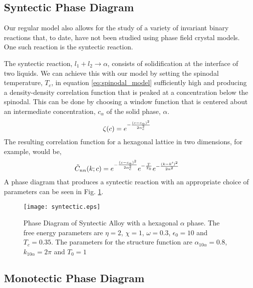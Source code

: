 \subsection{Syntectic Phase Diagram} %

Our regular model also allows for the study of a variety of invariant binary
reactions that, to date, have not been studied using phase field crystal
models. One such reaction is the syntectic reaction. 

The syntectic reaction, $l_1 + l_2 \rightarrow \alpha $, consists of
solidification at the interface of two liquids. We can achieve this with our
model by setting the spinodal temperature, $T_c$, in equation
\ref{eq:spinodal_model} sufficiently high and producing a density-density
correlation function that is peaked at a concentration below the spinodal. This
can be done by choosing a window function that is centered about an
intermediate concentration, $c_\alpha$ of the solid phase, $\alpha$. 
%
\begin{equation}
  \zeta(c) = e^{- \frac{(c - c_\alpha)^2}{2 \alpha_c^2}}
\end{equation}
%
The resulting correlation function for a hexagonal lattice in two dimensions,
for example, would be,
%
\begin{equation}
  \tilde{C}_{nn}(k; c) = 
    e^{-\frac{(c - c_\alpha)^2}{2 \alpha_c^2}}
    e^{-\frac{T}{T_0}} 
    e^{-\frac{(k - k^\prime)^2}{2\alpha^2}}
\end{equation}
%
A phase diagram that produces a syntectic reaction with an appropriate choice
of parameters can be seen in Fig. \ref{syntectic}.

\begin{figure}
    \centering
	\texttt{[image: syntectic.eps]}
    \caption[Syntectic Phase Diagram]{
        \label{syntectic} Phase Diagram of Syntectic Alloy with a hexagonal
        $\alpha$ phase. The free energy parameters are $\eta=2$, $\chi=1$,
        $\omega=0.3$, $\epsilon_0 = 10$ and $T_c=0.35$. The parameters for the
        structure function are $\alpha_{10\alpha} = 0.8$, $k_{10\alpha} = 2\pi$
        and $T_0 = 1$
    }
\end{figure}

\subsection{Monotectic Phase Diagram} %

